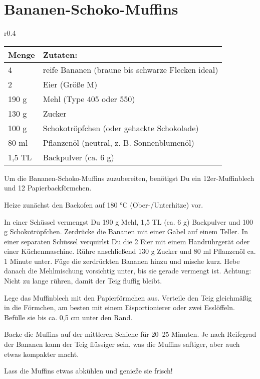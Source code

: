 \documentclass[../../book.tex]{subfiles}
\begin{document}
\section{Bananen-Schoko-Muffins}

\begin{wraptable}{r}{0.4\textwidth}
    \centering
    \begin{tabularx}{0.39\textwidth}{|l|X|}
        \toprule
        Menge & Zutaten: \\
        \midrule
        4 & reife Bananen (braune bis schwarze Flecken ideal) \\
        \midrule
        2 & Eier (Größe M) \\
        \midrule
        190 g & Mehl (Type 405 oder 550) \\
        \midrule
        130 g & Zucker \\
        \midrule
        100 g & Schokotröpfchen (oder gehackte Schokolade) \\
        \midrule
        80 ml & Pflanzenöl (neutral, z. B. Sonnenblumenöl) \\
        \midrule
        1,5 TL & Backpulver (ca. 6 g) \\
        \bottomrule
    \end{tabularx}
\end{wraptable}
Um die Bananen-Schoko-Muffins zuzubereiten, benötigst Du ein 12er-Muffinblech und 12 Papierbackförmchen.

Heize zunächst den Backofen auf 180 °C (Ober-/Unterhitze) vor.

In einer Schüssel vermengst Du 190 g Mehl, 1,5 TL (ca. 6 g) Backpulver und 100 g Schokotröpfchen. Zerdrücke die Bananen mit einer Gabel auf einem Teller.  
In einer separaten Schüssel verquirlst Du die 2 Eier mit einem Handrührgerät oder einer Küchenmaschine. Rühre anschließend 130 g Zucker und 80 ml Pflanzenöl ca. 1 Minute unter.  
Füge die zerdrückten Bananen hinzu und mische kurz. Hebe danach die Mehlmischung vorsichtig unter, bis sie gerade vermengt ist. Achtung: Nicht zu lange rühren, damit der Teig fluffig bleibt.  

Lege das Muffinblech mit den Papierförmchen aus. Verteile den Teig gleichmäßig in die Förmchen, am besten mit einem Eisportionierer oder zwei Esslöffeln. Befülle sie bis ca. 0,5 cm unter den Rand.  

Backe die Muffins auf der mittleren Schiene für 20–25 Minuten. Je nach Reifegrad der Bananen kann der Teig flüssiger sein, was die Muffins saftiger, aber auch etwas kompakter macht.  

Lass die Muffins etwas abkühlen und genieße sie frisch!  
\end{document}

